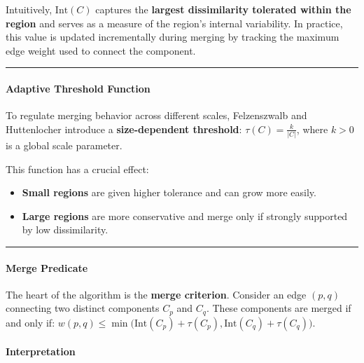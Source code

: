 \documentclass[11pt]{article}
\providecommand{\tightlist}{%
      \setlength{\itemsep}{0pt}\setlength{\parskip}{0pt}}
\begin{document}
Intuitively, \(\mathrm{Int}(C)\) captures the \textbf{largest
dissimilarity tolerated within the region} and serves as a measure of
the region's internal variability. In practice, this value is updated
incrementally during merging by tracking the maximum edge weight used to
connect the component.

\begin{center}\rule{0.5\linewidth}{0.5pt}\end{center}

\hypertarget{adaptive-threshold-function}{%
\paragraph{\texorpdfstring{\textbf{Adaptive Threshold
Function}}{Adaptive Threshold Function}}\label{adaptive-threshold-function}}

To regulate merging behavior across different scales, Felzenszwalb and
Huttenlocher introduce a \textbf{size-dependent threshold}:
\(\tau(C) = \frac{k}{|C|}\), where \(k > 0\) is a global scale
parameter.

This function has a crucial effect:

\begin{itemize}
\tightlist
\item
  \textbf{Small regions} are given higher tolerance and can grow more
  easily.
\item
  \textbf{Large regions} are more conservative and merge only if
  strongly supported by low dissimilarity.
\end{itemize}

\begin{center}\rule{0.5\linewidth}{0.5pt}\end{center}

\hypertarget{merge-predicate}{%
\paragraph{\texorpdfstring{\textbf{Merge
Predicate}}{Merge Predicate}}\label{merge-predicate}}

The heart of the algorithm is the \textbf{merge criterion}. Consider an
edge \((p,q)\) connecting two distinct components \(C_p\) and \(C_q\).
These components are merged if and only if:
\(w(p,q) \le \min\big( \mathrm{Int}(C_p) + \tau(C_p), \mathrm{Int}(C_q) + \tau(C_q) \big)\).

\hypertarget{interpretation}{%
\paragraph{\texorpdfstring{\textbf{Interpretation}}{Interpretation}}\label{interpretation}}
\end{document}
